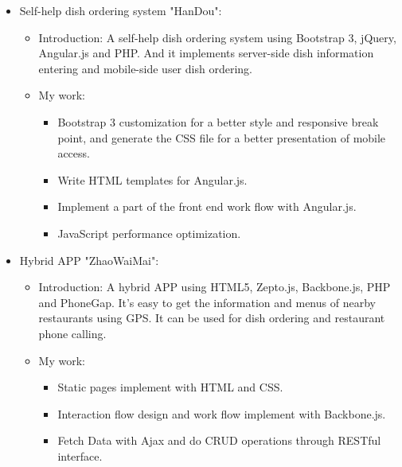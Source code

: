 \documentclass[11pt,a4paper,sans]{moderncv}        %
\begin{document}
{\begin{itemize}
\begin{itemize}
      \begin{itemize}%
        \item Mobile first and responsive design using HTML and CSS.
        \item Work flow design with Backbone.js.
        \item Algorithm implement of game rules with Underscore.js.
        \item Using pushstream.js and Nginx configurations to implement the function of html message push(such as Long polling, Web Socket and so on) in order to simulate the instant communications in multi-player games.
      \end{itemize}
  \end{itemize}
\item Self-help dish ordering system "HanDou":
  \begin{itemize}%
  \item Introduction: A self-help dish ordering system using Bootstrap 3, jQuery, Angular.js and PHP. And it implements server-side dish information entering and mobile-side user dish ordering.
  \item My work:
      \begin{itemize}%
        \item Bootstrap 3 customization for a better style and responsive break point, and generate the CSS file for a better presentation of mobile access.
        \item Write HTML templates for Angular.js.
        \item Implement a part of the front end work flow with Angular.js.
        \item JavaScript performance optimization.
      \end{itemize}
  \end{itemize}
\item Hybrid APP "ZhaoWaiMai":
  \begin{itemize}%
  \item Introduction: A hybrid APP using HTML5, Zepto.js, Backbone.js, PHP and PhoneGap. It's easy to get the information and menus of nearby restaurants using GPS. It can be used for dish ordering and restaurant phone calling.
  \item My work:
      \begin{itemize}%
        \item Static pages implement with HTML and CSS.
        \item Interaction flow design and work flow implement with Backbone.js.
        \item Fetch Data with Ajax and do CRUD operations through RESTful interface.
      \end{itemize}
  \end{itemize}
\end{itemize}}
\end{document}

